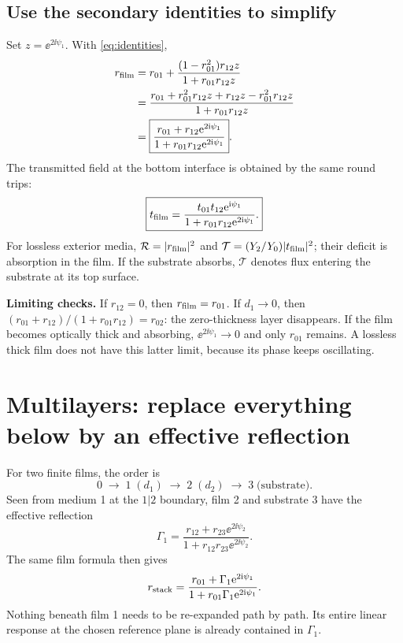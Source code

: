 \subsection{Use the secondary identities to simplify}
Set $z=\ee^{2\ii\psi_1}$. With \eqref{eq:identities},
\begin{align}
r_{\rm film}
&=r_{01}+\frac{(1-r_{01}^2)r_{12}z}{1+r_{01}r_{12}z}\\
&=\frac{r_{01}+r_{01}^2r_{12}z+r_{12}z-r_{01}^2r_{12}z}
{1+r_{01}r_{12}z}\\
&=\boxed{\frac{r_{01}+r_{12}\mathrm{e}^{2\mathrm{i}\psi_1}}
{1+r_{01}r_{12}\mathrm{e}^{2\mathrm{i}\psi_1}}}.
\label{eq:film}
\end{align}
The transmitted field at the bottom interface is obtained by the same round trips:
\begin{equation}
\boxed{t_{\rm film}=\frac{t_{01}t_{12}\mathrm{e}^{\mathrm{i}\psi_1}}
{1+r_{01}r_{12}\mathrm{e}^{2\mathrm{i}\psi_1}}.}
\end{equation}
For lossless exterior media, $\mathcal R=|r_{\rm film}|^2$ and
$\mathcal T=(Y_2/Y_0)|t_{\rm film}|^2$; their deficit is absorption in the film. If the substrate absorbs, $\mathcal T$ denotes flux entering the substrate at its top surface.

\textbf{Limiting checks.} If $r_{12}=0$, then $r_{\rm film}=r_{01}$. If $d_1\to0$, then $(r_{01}+r_{12})/(1+r_{01}r_{12})=r_{02}$: the zero-thickness layer disappears. If the film becomes optically thick and absorbing, $\ee^{2\ii\psi_1}\to0$ and only $r_{01}$ remains. A lossless thick film does not have this latter limit, because its phase keeps oscillating.

\section{Multilayers: replace everything below by an effective reflection}
For two finite films, the order is
\begin{equation}
0\;\longrightarrow\;1\;(d_1)\;\longrightarrow\;2\;(d_2)
\;\longrightarrow\;3\;\text{(substrate)}.
\end{equation}
Seen from medium 1 at the $1|2$ boundary, film 2 and substrate 3 have the effective reflection
\begin{equation}
\Gamma_1=\frac{r_{12}+r_{23}\ee^{2\ii\psi_2}}
{1+r_{12}r_{23}\ee^{2\ii\psi_2}}.
\end{equation}
The same film formula then gives
\begin{equation}
r_{\rm stack}=\frac{r_{01}+\Gamma_1\mathrm{e}^{2\mathrm{i}\psi_1}}
{1+r_{01}\Gamma_1\mathrm{e}^{2\mathrm{i}\psi_1}}.
\end{equation}
Nothing beneath film 1 needs to be re-expanded path by path. Its entire linear response at the chosen reference plane is already contained in $\Gamma_1$.


